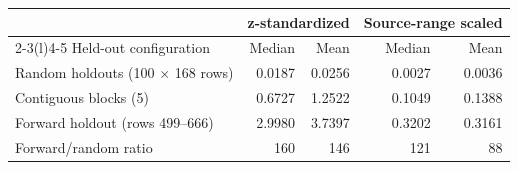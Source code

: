 \begin{tabular}{@{}lrrrr@{}}
\toprule
 & \multicolumn{2}{c}{z-standardized} & \multicolumn{2}{c}{Source-range scaled} \\
\cmidrule(lr){2-3}\cmidrule(l){4-5}
Held-out configuration & Median & Mean & Median & Mean \\
\midrule
Random holdouts (100 $\times$ 168 rows) & 0.0187 & 0.0256 & 0.0027 & 0.0036 \\
Contiguous blocks (5) & 0.6727 & 1.2522 & 0.1049 & 0.1388 \\
Forward holdout (rows 499--666) & 2.9980 & 3.7397 & 0.3202 & 0.3161 \\
\midrule
Forward/random ratio & 160 & 146 & 121 & 88 \\
\bottomrule
\end{tabular}
